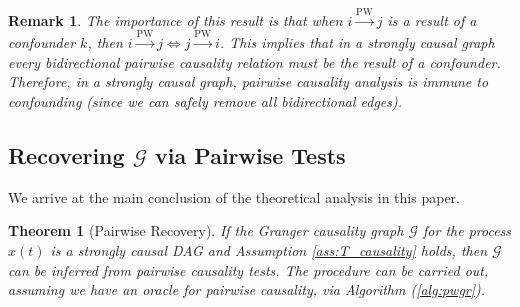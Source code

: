 \documentclass{statsoc}
\def\pwgc{\overset{\text{PW}}{\rightarrow}}  %
\def\gcg{\mathcal{G}}  %
\newtheorem{theorem}{Theorem}
\newtheorem{remark}{Remark}
\begin{document}
\begin{remark}
  The importance of this result is that when $i \pwgc j$ is a result
  of a confounder $k$, then $i \pwgc j \iff j \pwgc i$.  This
  implies that in a strongly causal graph every bidirectional pairwise
  causality relation must be the result of a confounder.  Therefore,
  in a strongly causal graph, pairwise causality analysis is
  \textit{immune to confounding} (since we can safely remove all
  bidirectional edges).
\end{remark}

\subsection{Recovering $\gcg$ via Pairwise Tests}
\label{sec:pairwise_algorithm}
We arrive at the main conclusion of the theoretical analysis in this
paper.

\begin{theorem}[Pairwise Recovery]
  \label{thm:scg_recovery}
  If the Granger causality graph $\gcg$ for the process $x(t)$ is a
  strongly causal DAG and Assumption \ref{ass:T_causality} holds, then
  $\gcg$ can be inferred from pairwise causality tests.  The procedure
  can be carried out, assuming we have an oracle for pairwise
  causality, via Algorithm (\ref{alg:pwgr}).
\end{theorem}
\end{document}
